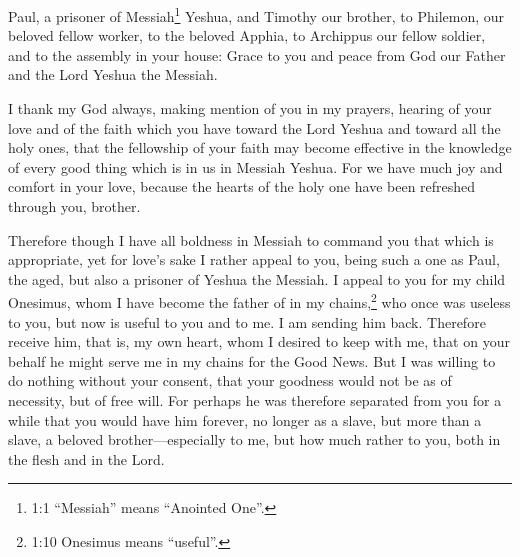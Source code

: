 





\vspace{-1.36in}
	
	
\mychapter{}  \myverse*{}Paul, a prisoner of Messiah\footnote{1:1 “Messiah” means “Anointed One”.} Yeshua, and Timothy our brother, to Philemon, our beloved fellow worker,	\myverse{}to the beloved Apphia, to Archippus our fellow soldier, and to the assembly in your house: \myverse{}Grace to you and peace from God our Father and the Lord Yeshua the Messiah.

\myverse{}I thank my God always, making mention of you in my prayers,	 \myverse{}hearing of your love and of the faith which you have toward the Lord Yeshua	and toward all the holy ones, \myverse{}that the fellowship of your faith may become effective in the knowledge of every good thing which is in us in Messiah Yeshua. \myverse{}For we have much joy and comfort in your love, because the hearts of the holy one have been refreshed through you, brother.
	
	
\myverse{}Therefore though I have all boldness in Messiah to command you that which is appropriate, \myverse{}yet for love’s sake I rather appeal to you, being such a one as Paul, the aged, but also a prisoner of Yeshua the Messiah. \myverse{}I appeal to you for my child Onesimus, whom I have become the father of in my chains,\footnote{1:10 Onesimus means “useful”.} \myverse{}who once was useless to you, but now is useful to you and to me. \myverse{}I am sending him back. Therefore receive him, that is, my own heart, \myverse{}whom I desired to keep with me, that on your behalf he might serve me in my chains for the Good News. \myverse{}But I was willing to do nothing without your consent, that your goodness would not be as of necessity, but of free will. \myverse{}For perhaps he was therefore separated from you for a while that you would have him forever, \myverse{}no longer as a slave, but more than a slave, a beloved brother—especially to me, but how much rather to you, both in the flesh and in the Lord.


